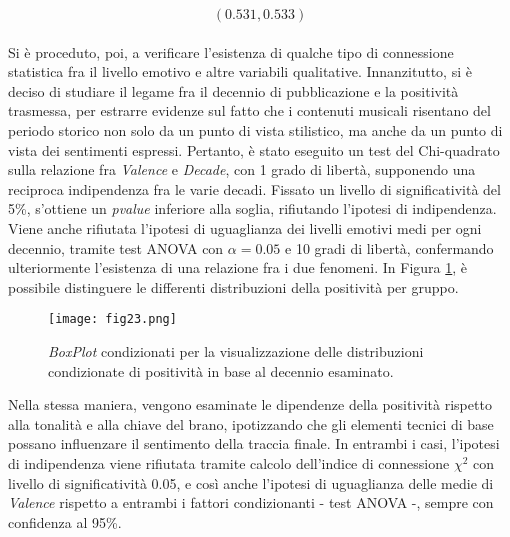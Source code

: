 \documentclass[fleqn,10pt]{SelfArx} %
\begin{document}
\begin{equation}
    (0.531, 0.533)
\end{equation}
\\
Si è proceduto, poi, a verificare l'esistenza di qualche tipo di connessione statistica fra il livello emotivo e altre variabili qualitative. Innanzitutto, si è deciso di studiare il legame fra il decennio di pubblicazione e la positività trasmessa, per estrarre evidenze sul fatto che i contenuti musicali risentano del periodo storico non solo da un punto di vista stilistico, ma anche da un punto di vista dei sentimenti espressi. Pertanto, è stato eseguito un test del Chi-quadrato sulla relazione fra \textit{Valence} e \textit{Decade}, con 1 grado di libertà, supponendo una reciproca indipendenza fra le varie decadi. Fissato un livello di significatività del 5\%, s'ottiene un \textit{pvalue} inferiore alla soglia, rifiutando l'ipotesi di indipendenza. Viene anche rifiutata l'ipotesi di uguaglianza dei livelli emotivi medi per ogni decennio, tramite test ANOVA con $\alpha=0.05$ e 10 gradi di libertà, confermando ulteriormente l'esistenza di una relazione fra i due fenomeni. In Figura \ref{fig:fig23}, è possibile distinguere le differenti distribuzioni della positività per gruppo. 
\begin{figure}[H]
    \centering
    \texttt{[image: fig23.png]}
    \caption{\textit{BoxPlot} condizionati per la visualizzazione delle distribuzioni condizionate di positività in base al decennio esaminato.}
    \label{fig:fig23}
\end{figure}
Nella stessa maniera, vengono esaminate le dipendenze della positività rispetto alla tonalità e alla chiave del brano, ipotizzando che gli elementi tecnici di base possano influenzare il sentimento della traccia finale. In entrambi i casi, l'ipotesi di indipendenza viene rifiutata tramite calcolo dell'indice di connessione $\chi^2$ con livello di significatività 0.05, e così anche l'ipotesi di uguaglianza delle medie di \textit{Valence} rispetto a entrambi i fattori condizionanti - test ANOVA -, sempre con confidenza al 95\%.
\end{document}
